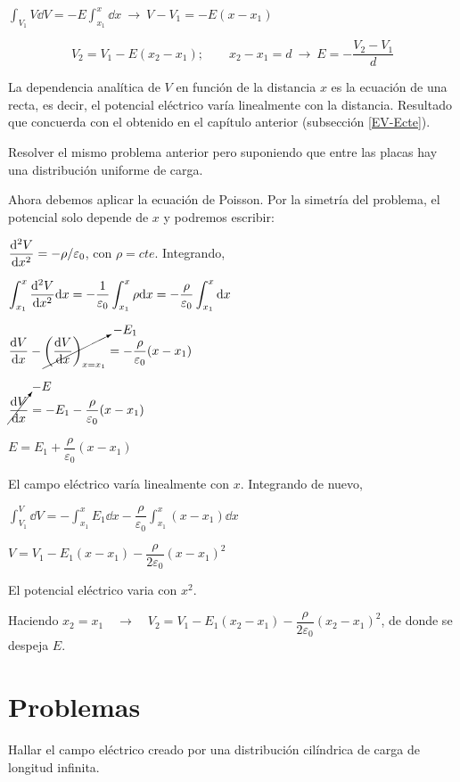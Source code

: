 $\displaystyle \int_{V_1}V \dd V=-E \int_{x_1}^x \dd x \ \to \ V-V_1=-E(x-x_1)$

$$V_2=V_1-E(x_2-x_1); \qquad x_2-x_1=d \ \to \ 	E=-\dfrac {V_2-V_1}{d}$$

La dependencia analítica de $V$ en función de la distancia $x$ es la ecuación de una recta, es decir, el potencial eléctrico varía linealmente con la distancia. Resultado que concuerda con el obtenido en el capítulo anterior (subsección \ref{EV-Ecte}).

\begin{ejem}
Resolver el mismo problema anterior pero suponiendo que entre las placas hay una distribución uniforme de carga.
\end{ejem}

Ahora debemos aplicar la ecuación de Poisson. Por la simetría del problema, el potencial solo depende de $x$ y podremos escribir:

$\displaystyle \dv[2]{V}{x}=-\rho / \varepsilon_0$, con $\rho=cte$. Integrando,

$\displaystyle \int_{x_1}^x \dv[2]{V}{x} \dd x = -\dfrac 1 {\varepsilon_0} \int_{x_1}^x \rho \dd x = -\dfrac \rho {\varepsilon_0} \int_{x_1}^x \dd x$

$\displaystyle \dv{V}{x}-\cancelto{-E_1}{\left( \dv{V}{x} \right)_{x=x_1}}=-\dfrac \rho {\varepsilon_0} (x-x_1)$

$\displaystyle \cancelto{-E}{\dv{V}{x}}=-E_1-\dfrac \rho {\varepsilon_0} (x-x_1)$

$\displaystyle E=E_1+\dfrac \rho {\varepsilon_0} (x-x_1)$

El campo eléctrico varía linealmente con $x$. Integrando de nuevo,

$\displaystyle \int_{V_1}^V \dd V = -\int_{x_1}^x E_1 \dd x - \dfrac \rho {\varepsilon_0} \int_{x_1}^x (x-x_1) \dd x$

$V=V_1-E_1(x-x_1)-\dfrac \rho {2\varepsilon_0} (x-x_1)^2$

El potencial eléctrico varia con $x^2$.

Haciendo $x_2=x_1 \quad \to \quad V_2=V_1-E_1(x_2-x_1)-\dfrac \rho {2\varepsilon_0} (x_2-x_1)^2$, de donde se despeja $E$.





\section{Problemas}

\begin{prob}
Hallar el campo eléctrico creado por una distribución cilíndrica de carga de longitud infinita.	
\end{prob}

